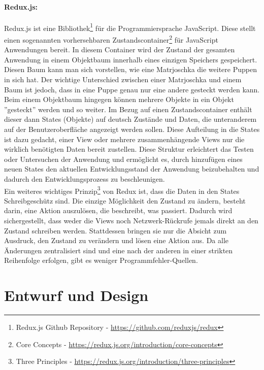 \documentclass[nomenclature, onesided, 150]{HSMW-Thesis}
\begin{document}
		\paragraph{Redux.js:}
			Redux.js ist eine Bibliothek\footnote{Redux.js Github Repository - \href{https://github.com/reduxjs/redux}{\url{https://github.com/reduxjs/redux}}} für die Programmiersprache JavaScript. Diese stellt einen sogenannten vorhersehbaren Zustandscontainer\footnote{Core Concepts - \href{https://redux.js.org/introduction/core-concepts}{\url{https://redux.js.org/introduction/core-concepts}}} für JavaScript Anwendungen bereit. In diesem Container wird der Zustand der gesamten Anwendung in einem Objektbaum innerhalb eines einzigen Speichers gespeichert. Diesen Baum kann man sich vorstellen, wie eine Matrjoschka die weitere Puppen in sich hat. Der wichtige Unterschied zwischen einer Matrjoschka und einem Baum ist jedoch, dass in eine Puppe genau nur eine andere gesteckt werden kann. Beim einem Objektbaum hingegen können mehrere Objekte in ein Objekt ''gesteckt'' werden und so weiter. Im Bezug auf einen Zustandscontainer enthält dieser dann States (Objekte) auf deutsch Zustände und Daten, die unteranderem auf der Benutzeroberfläche angezeigt werden sollen. Diese Aufteilung in die States ist dazu gedacht, einer View oder mehrere zusammenhängende Views nur die wirklich benötigten Daten bereit zustellen. Diese Struktur erleichtert das Testen oder Untersuchen der Anwendung und ermöglicht es, durch hinzufügen eines neuen States den aktuellen Entwicklungsstand der Anwendung beizubehalten und dadurch den Entwicklungsprozess zu beschleunigen. \\
			Ein weiteres wichtiges Prinzip\footnote{Three Principles - \href{https://redux.js.org/introduction/three-principles}{\url{https://redux.js.org/introduction/three-principles}}} von Redux ist, dass die Daten in den States Schreibgeschütz sind. Die einzige Möglichkeit den Zustand zu ändern, besteht darin, eine Aktion auszulösen, die beschreibt, was passiert. Dadurch wird sichergestellt, dass weder die Views noch Netzwerk-Rückrufe jemals direkt an den Zustand schreiben werden. Stattdessen bringen sie nur die Absicht zum Ausdruck, den Zustand zu verändern und lösen eine Aktion aus. Da alle Änderungen zentralisiert sind und eine nach der anderen in einer strikten Reihenfolge erfolgen, gibt es weniger Programmfehler-Quellen.

	\section{Entwurf und Design}
		
\end{document}
